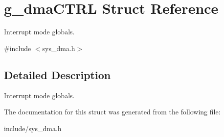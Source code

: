 \hypertarget{structg__dmaCTRL}{}\section{g\+\_\+dma\+C\+T\+RL Struct Reference}
\label{structg__dmaCTRL}


Interrupt mode globals.  




{\ttfamily \#include $<$sys\+\_\+dma.\+h$>$}



\subsection{Detailed Description}
Interrupt mode globals. 

The documentation for this struct was generated from the following file\+:\begin{DoxyCompactItemize}
\item 
include/sys\+\_\+dma.\+h\end{DoxyCompactItemize}
